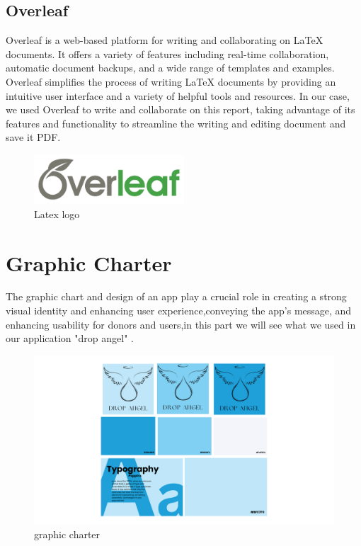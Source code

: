 \subsection{Overleaf }

Overleaf is a web-based platform for writing and collaborating on LaTeX documents. It offers a variety of features including real-time collaboration, automatic document backups, and a wide range of templates and examples. Overleaf simplifies the process of writing LaTeX documents by providing an intuitive user interface and a variety of helpful tools and resources. In our case, we used Overleaf to write and collaborate on this report, taking advantage of its features and functionality to streamline the writing and editing document and save it PDF.\cite{overleaf}
\begin{figure}[H]
    \centering
    \includegraphics[width=0.5\textwidth]{images/overleaf_wide_colour_light_bg.png}
    \caption{Latex logo}
    \label{fig:figure4}
\end{figure}



\section{Graphic Charter}
The graphic chart and design of an app play a crucial role in creating a strong visual identity and enhancing user experience,conveying the app's message, and enhancing usability for donors and users,in this part we will see what we used in our application "drop angel" .
    \begin{figure}[H]
    \centering
    \includegraphics[width=1.15\textwidth]{images/Let's brainstorm for thoughts, ideas, and inspiration using an idea board. (3).png}
    \caption{graphic charter}
    \label{fig:figure4}
\end{figure}


